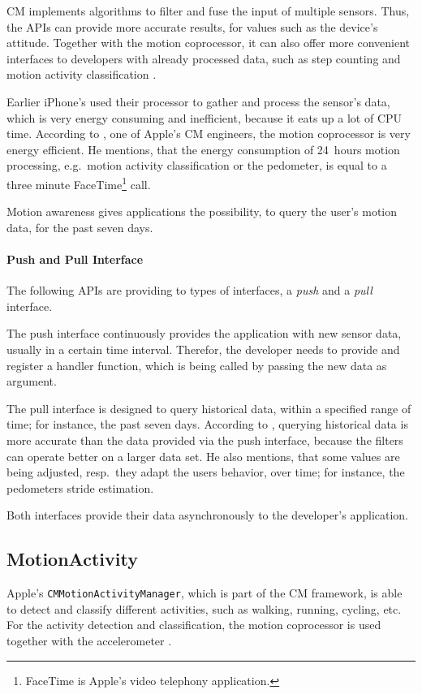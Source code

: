 \ac{CM} implements algorithms to filter and fuse the input of multiple sensors. Thus, the \acsp{API} can provide more accurate results, for values such as the device's attitude. Together with the motion coprocessor, it can also offer more convenient interfaces to developers with already processed data, such as step counting and motion activity classification \citep{apple:wwdc_2014_pham}.

Earlier iPhone's used their processor to gather and process the sensor's data, which is very energy consuming and inefficient, because it eats up a lot of \acs{CPU} time. According to \citet{apple:wwdc_2012_pham}, one of Apple's \ac{CM} engineers, the motion coprocessor is very energy efficient. He mentions, that the energy consumption of 24~hours motion processing, e.g.\ motion activity classification or the pedometer, is equal to a three minute FaceTime\footnote{FaceTime is Apple's video telephony application.} call.

Motion awareness gives applications the possibility, to query the user's motion data, for the past seven days.

\paragraph{Push and Pull Interface}
The following \acsp{API} are providing to types of interfaces, a \emph{push} and a \emph{pull} interface.

The push interface continuously provides the application with new sensor data, usually in a certain time interval. Therefor, the developer needs to provide and register a handler function, which is being called by passing the new data as argument.

The pull interface is designed to query historical data, within a specified range of time; for instance, the past seven days. According to \citet{apple:wwdc_2014_pham}, querying historical data is more accurate than the data provided via the push interface, because the filters can operate better on a larger data set. He also mentions, that some values are being adjusted, resp.\ they adapt the users behavior, over time; for instance, the pedometers stride estimation.

Both interfaces provide their data asynchronously to the developer's application.

\subsection{MotionActivity}
Apple's \texttt{CMMotionActivityManager}, which is part of the \ac{CM} framework, is able to detect and classify different activities, such as walking, running, cycling, etc. For the activity detection and classification, the motion coprocessor is used together with the accelerometer \citep{apple:wwdc_2014_pham}.

